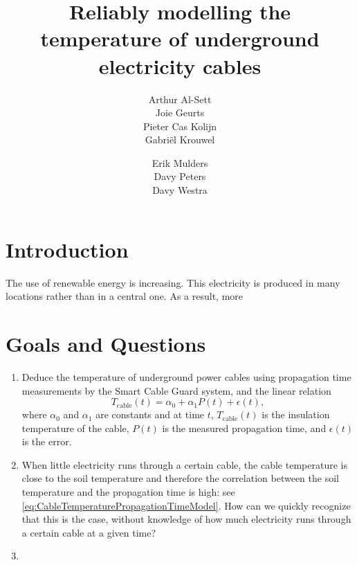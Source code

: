 \documentclass[11pt]{article}
\title{Reliably modelling the temperature of underground electricity cables}
\author{
Arthur Al-Sett \\
Joie Geurts \\
Pieter Cas Kolijn \\
Gabriël Krouwel
\and
Erik Mulders \\
Davy Peters \\
Davy Westra
}
\begin{document}
\maketitle

\section{Introduction}
The use of renewable energy is increasing. This electricity is produced in many locations rather than in a central one. As a result, more %

\section{Goals and Questions}  %
\begin{enumerate}
    \item Deduce the temperature of underground power cables using propagation time measurements by the Smart Cable Guard system, and the linear relation
    \begin{equation} \label{eq:CableTemperaturePropagationTimeModel}
        T_{\text{cable}}(t) = \alpha_0 + \alpha_1 P(t) + \epsilon(t),
    \end{equation}
    where $\alpha_0$ and $\alpha_1$ are constants and at time $t$, $T_{\text{cable}}(t)$ is the insulation temperature of the cable, $P(t)$ is the measured propagation time, and $\epsilon(t)$ is the error.

    \item When little electricity runs through a certain cable, the cable temperature is close to the soil temperature and therefore the correlation between the soil temperature and the propagation time is high: see \eqref{eq:CableTemperaturePropagationTimeModel}.
    How can we quickly recognize that this is the case, without knowledge of how much electricity runs through a certain cable at a given time?
    
    \item 

\end{enumerate}
\end{document}
